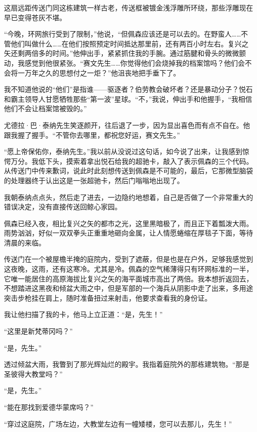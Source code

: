 \documentclass[AutoFakeBold=true]{book}
\begin{document}
这扇远距传送门同这栋建筑一样古老，传送框被镀金浅浮雕所环绕，那些浮雕现在早已变得苍灰不堪。

``今晚，环网旅行受到了限制，''他说，``但佩森应该还是可以去的。在野蛮人……不管他们叫做什么……在他们按照预定时间抵达那里前，还有两百小时左右。复兴之矢还剩两倍多的时间。''他伸出手，紧紧抓住我的手腕。通过筋腱和骨头的微微颤动，我感觉到他很紧张。``赛文先生……你觉得他们会烧掉我的档案馆吗？他们会不会将一万年之久的思想付之一炬？''他沮丧地把手垂下了。

我不知道他说的``他们''是指谁——驱逐者？伯劳教会破坏者？还是暴动分子？悦石和霸主领导人甘愿牺牲那些``第一波''星球。``不，''我说，伸出手和他握手，``我相信他们不会让档案馆被毁的。''

尤德拉·巴·泰纳先生笑逐颜开，往后退了一步，因为显出喜色而有点不自在。他跟我握了握手。``不管你去哪里，都祝您好运，赛文先生。''

``愿上帝保佑你，泰纳先生。''我以前从没说过这句话，如今说了出来，让我感到惊愕万分。我低下头，摸索着拿出悦石给我的超驰卡，敲入了表示佩森的三个代码。从传送门中传来歉词，说此时此刻想传送到佩森是不可能的，最后，它那微型脑袋的处理器终于认出这是一张超驰卡，然后门嗡嗡地出现了。

我朝泰纳点点头，然后走了进去，一边隐约地想着，自己是否做了一个非常重大的错误决定，没有直接传送回鲸心家园。

\vspace*{1em}

佩森已经入夜，相比复兴之矢的都市之光，这里黑暗极了，而且正下着瓢泼大雨。雨势汹汹，好似一双双拳头正重重地砸向金属，让人情愿蜷缩在厚毯子下面，等待清晨的来临。

传送门在一个被屋檐半掩的庭院内，受到了遮蔽，但是也是在户外，足够我感觉到这夜晚，这雨，还有这寒冷。尤其是冷。佩森的空气稀薄得只有环网标准的一半，它唯一能居住的高原海拔比复兴之矢的海平面城市高出了两倍。我本想折返回去，不想踏进这黑夜和倾盆大雨之中，但是军部的一个海兵从阴影中走了出来，多用途突击步枪挂在肩上，随时准备扭过来射击，他要求查看我的身份证。

我让他扫描了我的卡，他马上立正道：``是，先生！''

``这里是新梵蒂冈吗？''

``是，先生。''

透过倾盆大雨，我瞥到了那光辉灿烂的殿宇。我指着庭院外的那栋建筑物。``那是圣彼得大教堂吗？''

``是，先生。''

``能在那找到爱德华蒙席吗？''

``穿过这庭院，广场左边，大教堂左边有一幢矮楼，您可以去那儿，先生！''
\end{document}
